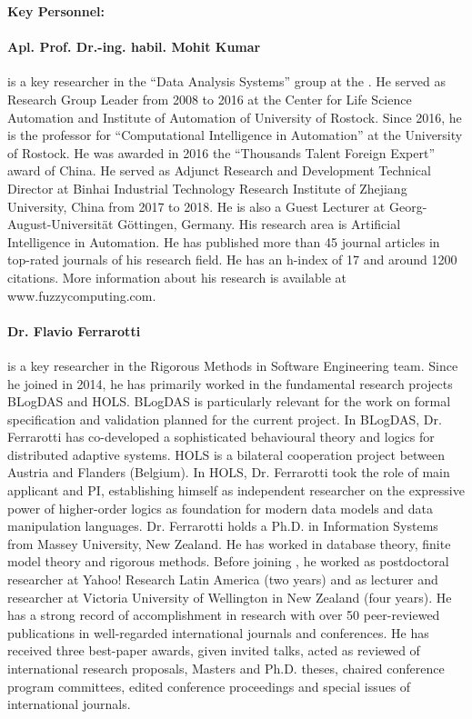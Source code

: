 \documentclass[a4paper,11pt]{article}
\begin{document}
\textbf{Key Personnel:\\}
\paragraph{Apl. Prof. Dr.-ing. habil. Mohit Kumar} is a key researcher in the ``Data Analysis Systems'' group at the \SCCHshort{}. He served as Research Group Leader from 2008 to 2016 at the Center for Life Science Automation and Institute of Automation of University of Rostock. Since 2016, he is the professor for ``Computational Intelligence in Automation'' at the University of Rostock. He was awarded in 2016 the ``Thousands Talent Foreign Expert'' award of China. He served as Adjunct Research and Development Technical Director at Binhai Industrial Technology Research Institute of Zhejiang University, China from 2017 to 2018. He is also a Guest Lecturer at Georg-August-Universität Göttingen, Germany. His research area is Artificial Intelligence in Automation. He has published more than 45 journal articles in top-rated journals of his research field. He has an h-index of 17 and around 1200 citations. More information about his research is available at www.fuzzycomputing.com.

\paragraph{Dr. Flavio Ferrarotti} is a key researcher in the Rigorous Methods in Software Engineering team. Since he joined \SCCHshort{} in 2014, he has primarily worked in the fundamental research projects BLogDAS and HOLS. BLogDAS is particularly relevant for the work on formal specification and validation planned for the current project. In BLogDAS, Dr. Ferrarotti has co-developed a sophisticated behavioural theory and logics for distributed adaptive systems. HOLS is a bilateral cooperation project between Austria and Flanders (Belgium). In HOLS, Dr. Ferrarotti took the role of main applicant and PI, establishing himself as independent researcher on the expressive power of higher-order logics as foundation for modern data models and data manipulation languages. Dr. Ferrarotti holds a Ph.D. in Information Systems from Massey University, New Zealand. He has worked in database theory, finite model theory and rigorous methods. Before joining \SCCHshort{}, he worked as postdoctoral researcher at Yahoo! Research Latin America (two years) and as lecturer and researcher at Victoria University of Wellington in New Zealand (four years). He has a strong record of accomplishment in research with over 50 peer-reviewed publications in well-regarded international journals and conferences. He has received three best-paper awards, given invited talks, acted as reviewed of international research proposals, Masters and Ph.D. theses, chaired conference program committees, edited conference proceedings and special issues of international journals.
\end{document}
